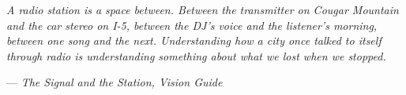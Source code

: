 \documentclass[11pt,letterpaper]{article}
\begin{document}
\vspace{1em}

\begin{quotebox}
\textit{A radio station is a space between. Between the transmitter on Cougar Mountain and the car stereo on I-5, between the DJ's voice and the listener's morning, between one song and the next. Understanding how a city once talked to itself through radio is understanding something about what we lost when we stopped.}

\vspace{0.5em}
\hfill --- \textit{The Signal and the Station, Vision Guide}
\end{quotebox}
\end{document}
